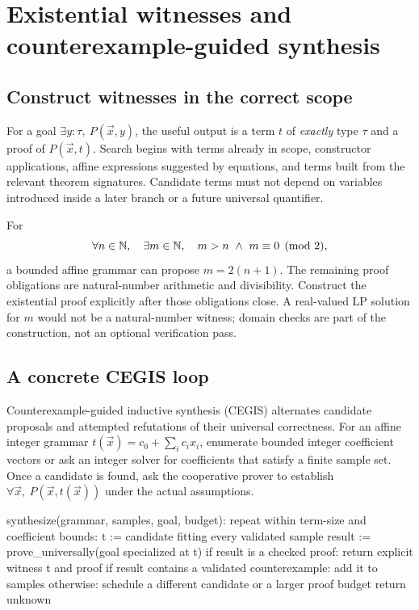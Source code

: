 \documentclass[11pt,a4paper]{article}
\begin{document}
\section{Existential witnesses and counterexample-guided synthesis}

\subsection{Construct witnesses in the correct scope}

For a goal $\exists y:\tau,\ P(\vec x,y)$, the useful output is a term $t$ of
\emph{exactly} type $\tau$ and a proof of $P(\vec x,t)$. Search begins with
terms already in scope, constructor applications, affine expressions suggested
by equations, and terms built from the relevant theorem signatures. Candidate
terms must not depend on variables introduced inside a later branch or a
future universal quantifier.

For
\[
 \forall n\in\mathbb{N},\quad\exists m\in\mathbb{N},\quad m>n\ \wedge\ m\equiv0\pmod2,
\]
a bounded affine grammar can propose $m=2(n+1)$. The remaining proof obligations
are natural-number arithmetic and divisibility. Construct the existential
proof explicitly after those obligations close. A real-valued LP solution for
$m$ would not be a natural-number witness; domain checks are part of the
construction, not an optional verification pass.

\subsection{A concrete CEGIS loop}

Counterexample-guided inductive synthesis (CEGIS) alternates candidate proposals
and attempted refutations of their universal correctness. For an affine
integer grammar $t(\vec x)=c_0+\sum_i c_i x_i$, enumerate bounded integer
coefficient vectors or ask an integer solver for coefficients that satisfy a
finite sample set. Once a candidate is found, ask the cooperative prover to
establish $\forall\vec x,\ P(\vec x,t(\vec x))$ under the actual assumptions.

\begin{Code}
synthesize(grammar, samples, goal, budget):
  repeat within term-size and coefficient bounds:
    t := candidate fitting every validated sample
    result := prove_universally(goal specialized at t)
    if result is a checked proof:
      return explicit witness t and proof
    if result contains a validated counterexample:
      add it to samples
    otherwise:
      schedule a different candidate or a larger proof budget
  return unknown
\end{Code}
\end{document}
